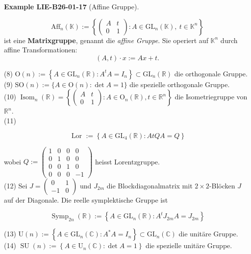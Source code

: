 \documentclass[10pt, letterpaper]{article}
\newcommand{\CustomHeading}[3]{%
  \par\medskip\noindent%
  \textbf{#1 #2} \textnormal{(#3)}.\enskip%
}
\newenvironment{EXA}[2]{\begin{unitbox}\CustomHeading{Example}{#1}{#2}}{\end{unitbox}}
\begin{document}
\begin{EXA}{LIE-B26-01-17}{Affine Gruppe}
\[
\mathrm{Aff}_{n}(\mathbb{K}) :=
\left\{
\begin{pmatrix}
A & t \\[3pt]
0 & 1
\end{pmatrix}
: A \in \mathrm{GL}_{n}(\mathbb{K}),\ t \in \mathbb{K}^{n}
\right\}
\]
ist eine \textbf{Matrixgruppe}, genannt die \emph{affine Gruppe}.  
Sie operiert auf $\mathbb{K}^{n}$ durch affine Transformationen:
\[
(A,t)\cdot x := A x + t.
\]
\end{EXA}





(8) $\mathrm{O}(n):=\left\{A \in \mathrm{GL}_{n}(\mathbb{R}): A^{t} A=I_{n}\right\} \subset \mathrm{GL}_{n}(\mathbb{R})$ die orthogonale Gruppe.\\
(9) $\mathrm{SO}(n):=\{A \in \mathrm{O}(n): \operatorname{det} A=1\}$ die spezielle orthogonale Gruppe.\\
(10) $\operatorname{Isom}_{n}(\mathbb{R})=\left\{\left(\begin{array}{cc}A & t \\ 0 & 1\end{array}\right): A \in \mathrm{O}_{n}(\mathbb{R}), t \in \mathbb{R}^{n}\right\}$ die Isometriegruppe von $\mathbb{R}^{n}$.\\
(11)

$$
\text { Lor }:=\left\{A \in \mathrm{GL}_{4}(\mathbb{R}): A t Q A=Q\right\}
$$

wobei $Q:=\left(\begin{array}{cccc}1 & 0 & 0 & 0 \\ 0 & 1 & 0 & 0 \\ 0 & 0 & 1 & 0 \\ 0 & 0 & 0 & -1\end{array}\right)$ heisst Lorentzgruppe.\\
(12) Sei $J=\left(\begin{array}{cc}0 & 1 \\ -1 & 0\end{array}\right)$ und $J_{2 m}$ die Blockdiagonalmatrix mit $2 \times 2$-Blöcken $J$ auf der Diagonale. Die reelle symplektische Gruppe ist

$$
\operatorname{Symp}_{2 n}(\mathbb{R}):=\left\{A \in \mathrm{GL}_{n}(\mathbb{R}): A^{t} J_{2 m} A=J_{2 m}\right\}
$$

(13) $\mathrm{U}(n):=\left\{A \in \mathrm{GL}_{n}(\mathbb{C}): A^{*} A=I_{n}\right\} \subset \mathrm{GL}_{n}(\mathbb{C})$ die unitäre Gruppe.\\
(14) $\operatorname{SU}(n):=\left\{A \in \mathrm{U}_{n}(\mathbb{C}): \operatorname{det} A=1\right\}$ die spezielle unitäre Gruppe.\\
\end{document}
